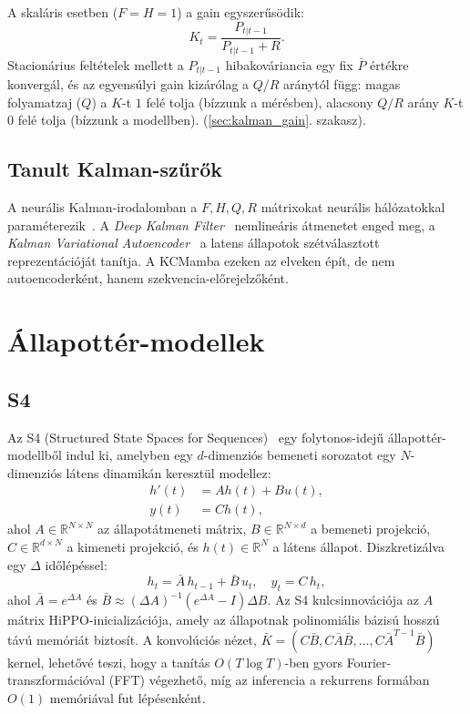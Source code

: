 A skaláris esetben ($F = H = 1$) a gain egyszerűsödik:
\begin{equation}
    K_t = \frac{P_{t|t-1}}{P_{t|t-1} + R}.
    \label{eq:kalman_gain_scalar}
\end{equation}
Stacionárius feltételek mellett a $P_{t|t-1}$ hibakováriancia egy fix
$\bar{P}$ értékre konvergál, és az egyensúlyi gain kizárólag a $Q/R$
aránytól függ: magas folyamatzaj ($Q$) a $K$-t $1$ felé tolja (bízzunk
a mérésben), alacsony $Q/R$ arány $K$-t $0$ felé tolja (bízzunk
a modellben). (\ref{sec:kalman_gain}. szakasz).

\subsection{Tanult Kalman-szűrők}

A neurális Kalman-irodalomban a $F, H, Q, R$ mátrixokat neurális hálózatokkal
paraméterezik~\cite{krishnan2015deep,fraccaro2017disentangled}.
A \emph{Deep Kalman Filter}~\cite{krishnan2015deep} nemlineáris átmenetet
enged meg, a \emph{Kalman Variational Autoencoder}~\cite{fraccaro2017disentangled}
a latens állapotok szétválasztott reprezentációját tanítja.
A KCMamba ezeken az elveken épít, de nem autoencoderként, hanem
szekvencia-előrejelzőként.

\section{Állapottér-modellek}
\label{sec:ssm}

\subsection{S4}

Az S4 (Structured State Spaces for Sequences)~\cite{gu2021s4} egy
folytonos-idejű állapottér-modellből indul ki, amelyben egy $d$-dimenziós
bemeneti sorozatot egy $N$-dimenziós látens dinamikán keresztül modellez:
\begin{align}
    h'(t) &= A h(t) + B u(t), \\
    y(t) &= C h(t),
\end{align}
ahol $A \in \mathbb{R}^{N \times N}$ az állapotátmeneti mátrix, $B \in \mathbb{R}^{N \times d}$
a bemeneti projekció, $C \in \mathbb{R}^{d \times N}$ a kimeneti projekció,
és $h(t) \in \mathbb{R}^N$ a látens állapot.
Diszkretizálva egy $\Delta$ időlépéssel:
\begin{equation}
    h_t = \bar{A}\, h_{t-1} + \bar{B}\, u_t, \quad y_t = C\, h_t,
\end{equation}
ahol $\bar{A} = e^{\Delta A}$ és $\bar{B} \approx (\Delta A)^{-1}(e^{\Delta A} - I) \Delta B$.
Az S4 kulcsinnovációja az $A$ mátrix HiPPO-inicializációja, amely
az állapotnak polinomiális bázisú hosszú távú memóriát biztosít.
A konvolúciós nézet, $\bar{K} = (C\bar{B}, C\bar{A}\bar{B}, \ldots, C\bar{A}^{T-1}\bar{B})$
kernel, lehetővé teszi, hogy a tanítás $O(T \log T)$-ben
gyors Fourier-transzformációval (FFT) végezhető, míg az inferencia a rekurrens formában $O(1)$ memóriával
fut lépésenként.

